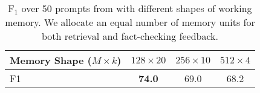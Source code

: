 \begin{table}
    \centering
    \begin{tabular}{lccc} \toprule
      Memory Shape ($M\times k$) & $128\times 20$ & $256\times 10$ & $512\times 4$ \\ \midrule
       F1  & \bf 74.0 & 69.0 & 68.2 \\\bottomrule
    \end{tabular}
    \caption{\vs F$_1$ over 50 prompts from \lf with different shapes of working memory. We allocate an equal number of memory units for both retrieval and fact-checking feedback.}
    \label{tab:memory_unit_shape_ablation}
\end{table}
